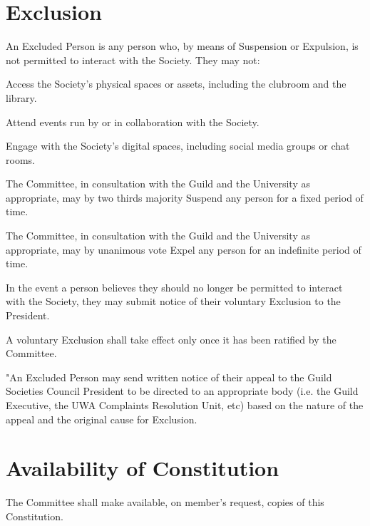 \documentclass[a4paper]{article}
\begin{document}
\section{Exclusion} \label{sec:exclusion}
\begin{myEnumerate}
    \item An Excluded Person is any person who, by means of Suspension or Expulsion, is not permitted to interact with the Society. They may not:
        \begin{myEnumerate}
            \item Access the Society’s physical spaces or assets, including the clubroom and the library.
            \item Attend events run by or in collaboration with the Society.
            \item Engage with the Society’s digital spaces, including social media groups or chat rooms.
        \end{myEnumerate}
    \item The Committee, in consultation with the Guild and the University as appropriate, may by two thirds majority Suspend any person for a fixed period of time.
    \item The Committee, in consultation with the Guild and the University as appropriate, may by unanimous vote Expel any person for an indefinite period of time.
    \item In the event a person believes they should no longer be permitted to interact with the Society, they may submit notice of their voluntary Exclusion to the President.
        \begin{myEnumerate}
            \item A voluntary Exclusion shall take effect only once it has been ratified by the Committee.
        \end{myEnumerate}
    \item "An Excluded Person may send written notice of their appeal to the Guild Societies Council President to be directed to an appropriate body (i.e. the Guild Executive, the UWA Complaints Resolution Unit, etc) based on the nature of the appeal and the original cause for Exclusion.
\end{myEnumerate}


\section{Availability of Constitution} \label{sec:availability}
\begin{myEnumerate}
    \item The Committee shall make available, on member's request, copies of this Constitution.
\end{myEnumerate}
\end{document}
